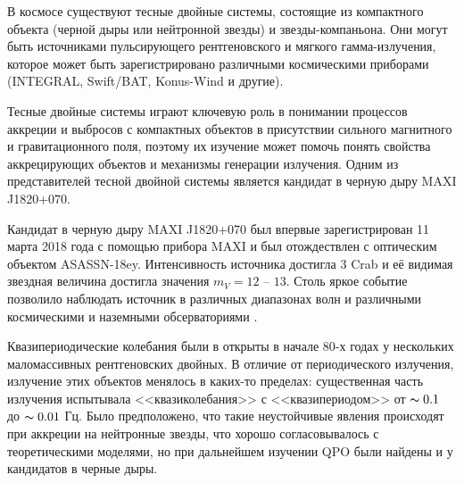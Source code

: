 	В космосе существуют тесные двойные системы, состоящие из компактного объекта (черной дыры или нейтронной звезды) и звезды-компаньона. Они могут быть источниками пульсирующего рентгеновского и мягкого гамма-излучения, которое может быть зарегистрировано различными космическими приборами (INTEGRAL, Swift/BAT, Konus-Wind и другие).
	
	Тесные двойные системы играют ключевую роль в понимании процессов аккреции и выбросов с компактных объектов в присутствии сильного магнитного и гравитационного поля, поэтому их изучение может помочь понять свойства аккрецирующих объектов и механизмы генерации излучения. Одним из представителей тесной двойной системы является кандидат в черную дыру MAXI J1820+070.
			
	Кандидат в черную дыру MAXI J1820+070 был впервые зарегистрирован 11 марта 2018 года с помощью прибора MAXI и был отождествлен с оптическим объектом ASASSN-18ey. Интенсивность источника достигла 3 Crab и её видимая звездная величина достигла значения $m_{V} = 12$ -- $13$. Столь яркое событие позволило наблюдать источник в различных диапазонах волн и различными космическими и наземными обсерваториями \cite{veledinaa.2018}.
	
	Квазипериодические колебания были в открыты в начале 80-х годах у нескольких маломассивных рентгеновских двойных. В отличие от периодического излучения, излучение этих объектов менялось в каких-то пределах: существенная часть излучения испытывала <<квазиколебания>> с <<квазипериодом>> от $\thicksim 0.1$ до $\thicksim 0.01$ Гц. Было предположено, что такие неустойчивые явления происходят при аккреции на нейтронные звезды, что хорошо согласовывалось с теоретическими моделями, но при дальнейшем изучении QPO были найдены и у кандидатов в черные дыры.